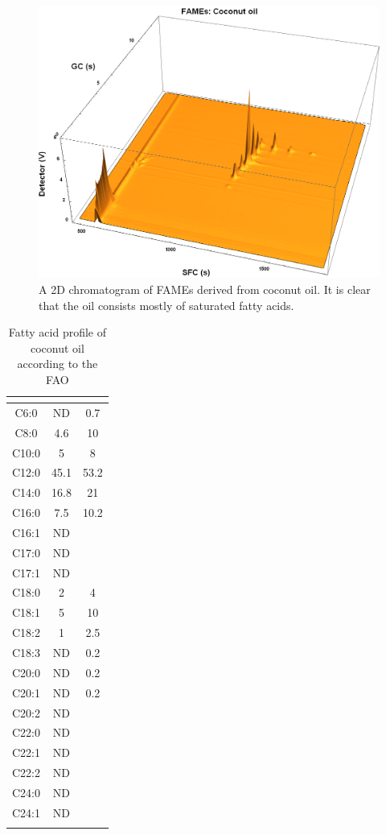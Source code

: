 \begin{figure}
\centering
\includegraphics[width=\textwidth]{Figures/Coconut.png}
\decoRule

\caption[SFC×GC of coconut oil]{A 2D chromatogram of FAMEs derived from
coconut oil. It is clear that the oil consists mostly of saturated fatty
acids.}

\label{fig:2DCoconut}
\end{figure}




\begin{table}
	\caption{Fatty acid profile of coconut oil according to the FAO \autocite{JFWCAC2002}}
	\label{tab:CoconutFAO}
	\centering
\begin{tabular}{c|c|c}
\toprule
	\tabhead{Fatty acid} & \tabhead{Lower} &   	\autocite{Upper}	\\
	\midrule
C6:0	&ND&	0.7	\\
C8:0	&4.6	&10\\
C10:0	&5	&8	\\
C12:0	&45.1	&53.2	\\
C14:0	&16.8	&21	\\
C16:0	&7.5	&10.2	\\
C16:1	&ND	&	\\
C17:0	&ND	&	\\
C17:1	&ND	&	\\
C18:0	&2	&4	\\
C18:1	&5	&10	\\
C18:2	&1	&2.5	\\
C18:3	&ND	&0.2	\\
C20:0	&ND	&0.2	\\
C20:1	&ND	&0.2	\\
C20:2	&ND	&	\\
C22:0	&ND	&	\\
C22:1	&ND	&	\\
C22:2	&ND	&	\\
C24:0	&ND	&	\\
C24:1	&ND	&	\\
	\bottomrule\\
\end{tabular}
\end{table}


